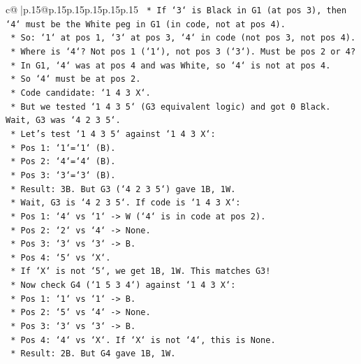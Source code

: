 \documentclass{article}
\begin{document}
{\begin{supertabular}{c@{$\;$}|p{.15\linewidth}@{}p{.15\linewidth}p{.15\linewidth}p{.15\linewidth}p{.15\linewidth}p{.15\linewidth}}
{{{\texttt{        *   If `3` is Black in G1 (at pos 3), then `4` must be the White peg in G1 (in code, not at pos 4).} \\
\texttt{        *   So: `1` at pos 1, `3` at pos 3, `4` in code (not pos 3, not pos 4).} \\
\texttt{        *   Where is `4`? Not pos 1 (`1`), not pos 3 (`3`). Must be pos 2 or 4?} \\
\texttt{        *   In G1, `4` was at pos 4 and was White, so `4` is not at pos 4.} \\
\texttt{        *   So `4` must be at pos 2.} \\
\texttt{        *   Code candidate: `1 4 3 X`.} \\
\texttt{        *   But we tested `1 4 3 5` (G3 equivalent logic) and got 0 Black. Wait, G3 was `4 2 3 5`.} \\
\texttt{        *   Let's test `1 4 3 5` against `1 4 3 X`:} \\
\texttt{            *   Pos 1: `1`=`1` (B).} \\
\texttt{            *   Pos 2: `4`=`4` (B).} \\
\texttt{            *   Pos 3: `3`=`3` (B).} \\
\texttt{            *   Result: 3B. But G3 (`4 2 3 5`) gave 1B, 1W.} \\
\texttt{            *   Wait, G3 is `4 2 3 5`. If code is `1 4 3 X`:} \\
\texttt{                *   Pos 1: `4` vs `1` {-}> W (`4` is in code at pos 2).} \\
\texttt{                *   Pos 2: `2` vs `4` {-}> None.} \\
\texttt{                *   Pos 3: `3` vs `3` {-}> B.} \\
\texttt{                *   Pos 4: `5` vs `X`.} \\
\texttt{                *   If `X` is not `5`, we get 1B, 1W. This matches G3!} \\
\texttt{            *   Now check G4 (`1 5 3 4`) against `1 4 3 X`:} \\
\texttt{                *   Pos 1: `1` vs `1` {-}> B.} \\
\texttt{                *   Pos 2: `5` vs `4` {-}> None.} \\
\texttt{                *   Pos 3: `3` vs `3` {-}> B.} \\
\texttt{                *   Pos 4: `4` vs `X`. If `X` is not `4`, this is None.} \\
\texttt{                *   Result: 2B. But G4 gave 1B, 1W.} \\
}}}
\end{supertabular}}
\end{document}
